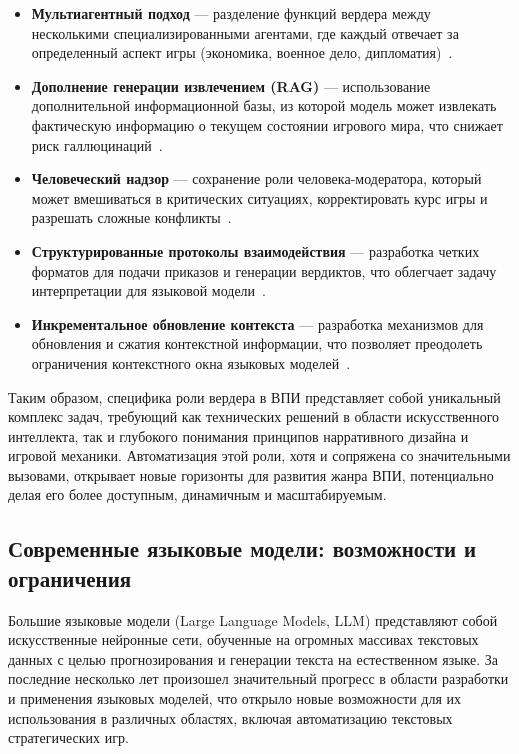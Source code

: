 \begin{itemize}
    \item \textbf{Мультиагентный подход} — разделение функций вердера между несколькими специализированными агентами, где каждый отвечает за определенный аспект игры (экономика, военное дело, дипломатия)~\cite{multi-agent-systems}.

    \item \textbf{Дополнение генерации извлечением (RAG)} — использование дополнительной информационной базы, из которой модель может извлекать фактическую информацию о текущем состоянии игрового мира, что снижает риск галлюцинаций~\cite{rag-applications}.

    \item \textbf{Человеческий надзор} — сохранение роли человека-модератора, который может вмешиваться в критических ситуациях, корректировать курс игры и разрешать сложные конфликты~\cite{human-ai-collaboration}.

    \item \textbf{Структурированные протоколы взаимодействия} — разработка четких форматов для подачи приказов и генерации вердиктов, что облегчает задачу интерпретации для языковой модели~\cite{llm-applications}.

    \item \textbf{Инкрементальное обновление контекста} — разработка механизмов для обновления и сжатия контекстной информации, что позволяет преодолеть ограничения контекстного окна языковых моделей~\cite{llm-context-window}.
\end{itemize}

Таким образом, специфика роли вердера в ВПИ представляет собой уникальный комплекс задач, требующий как технических решений в области искусственного интеллекта, так и глубокого понимания принципов нарративного дизайна и игровой механики. Автоматизация этой роли, хотя и сопряжена со значительными вызовами, открывает новые горизонты для развития жанра ВПИ, потенциально делая его более доступным, динамичным и масштабируемым.

\subsection{Современные языковые модели: возможности и ограничения}

Большие языковые модели (Large Language Models, LLM) представляют собой искусственные нейронные сети, обученные на огромных массивах текстовых данных с целью прогнозирования и генерации текста на естественном языке. За последние несколько лет произошел значительный прогресс в области разработки и применения языковых моделей, что открыло новые возможности для их использования в различных областях, включая автоматизацию текстовых стратегических игр.

